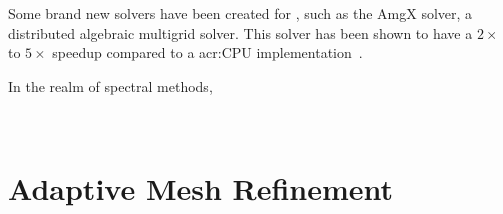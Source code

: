 Some brand new solvers have been created for , such as the AmgX solver, a
distributed algebraic multigrid solver. This solver has been shown to have a \(2 \times \) to \(5
\times \) speedup compared to a \acrshort{acr:CPU} implementation~\cite{Naumov2015}.

In the realm of spectral methods, 

~\cite{Fischer2021} %
~\cite{Medina2014} %

\section{Adaptive Mesh Refinement}\label{section:literature_review:amr}
~\cite{Schive2018} %

